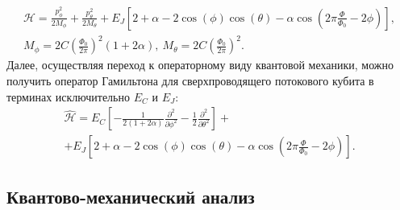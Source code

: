\documentclass[12pt, twoside]{report}
\numberwithin{equation}{section}
\numberwithin{figure}{section}
\begin{document}
\begin{gather*}
\mathcal{H} = \frac{p_\phi^2}{2M_\phi} + \frac{p_\theta^2}{2M_\theta}+ E_J\left[2+\alpha - 2\cos(\phi)\cos(\theta) - \alpha\cos\left(2\pi\frac{\Phi}{\Phi_0} -2\phi\right)\right], \\
M_\phi = 2C\left(\frac{\Phi_0}{2\pi}\right)^2(1+2\alpha),\ M_\theta = 2C\left(\frac{\Phi_0}{2\pi}\right)^2.
\end{gather*}
Далее, осуществляя переход к операторному виду квантовой механики, можно получить оператор Гамильтона для сверхпроводящего потокового кубита в терминах исключительно $E_C$ и $E_J$:
\begin{equation}
\begin{gathered}
\hat{\mathcal{H}} = E_C\left[-\frac{1}{2(1 + 2\alpha)}\frac{\partial^2}{\partial\phi^2} 
- \frac{1}{2}\frac{\partial^2}{\partial\theta^2}\right] + \\ + E_J\left[2+\alpha - 2\cos(\phi)\cos(\theta) - \alpha\cos\left(2\pi\frac{\Phi}{\Phi_0} -2\phi \right)\right].
\end{gathered}
\label{eq:hamiltonian}
\end{equation}

\subsection{Квантово-механический анализ}
\end{document}

